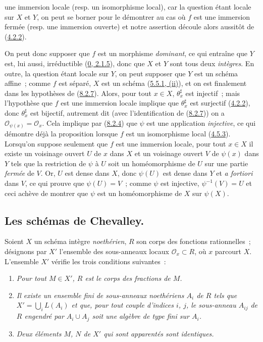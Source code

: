 une immersion locale (resp. un isomorphisme local), car la question étant
locale sur $X$ et $Y$, on peut se borner pour le démontrer au cas où $f$ est
une immersion fermée (resp. une immersion ouverte) et notre assertion découle
alors aussitôt de (\hyperref[I.4.2.2-fr]{4.2.2}).

On peut donc supposer que $f$ est un morphisme \emph{dominant}, ce qui
entraîne que $Y$ est, lui aussi, irréductible
(\hyperref[0.2.1.5-fr]{0, 2.1.5}), donc que $X$ et $Y$ sont tous deux
\emph{intègres}. En outre, la question étant locale sur $Y$, on peut supposer
que $Y$ est un schéma affine~; comme $f$ est séparé, $X$ est un schéma
(\hyperref[I.5.5.1-fr]{5.5.1, (ii)}), et on est finalement dans les
hypothèses de (\hyperref[I.8.2.7-fr]{8.2.7}). Alors, pour tout $x\in X$,
$\theta_x^\sharp$ est injectif~; mais l'hypothèse que $f$ est une immersion
locale implique que $\theta_x^\sharp$ est surjectif
(\hyperref[I.4.2.2-fr]{4.2.2}), donc $\theta_x^\sharp$ est bijectif,
autrement dit (avec l'identification de
(\hyperref[I.8.2.7-fr]{8.2.7})) on a
$\mathscr{O}_{\psi(x)}=\mathscr{O}_x$. Cela implique par
(\hyperref[I.8.2.4-fr]{8.2.4}) que $\psi$ est une application
\emph{injective}, ce qui démontre déjà la proposition lorsque $f$ est un
isomorphisme local (\hyperref[I.4.5.3-fr]{4.5.3}). Lorsqu'on suppose seulement
que $f$ est une immersion locale, pour tout $x\in X$ il existe un voisinage
ouvert $U$ de $x$ dans $X$ et un voisinage ouvert $V$ de $\psi(x)$ dans $Y$
tels que la restriction de $\psi$ à $U$ soit un homéomorphisme de $U$ sur une
partie \emph{fermée} de $V$. Or, $U$ est dense dans $X$, donc $\psi(U)$ est
dense dans $Y$ et \emph{a fortiori} dans $V$, ce qui prouve que
$\psi(U)=V$~; comme $\psi$ est injective, $\psi^{-1}(V)=U$ et ceci achève de
montrer que $\psi$ est un homéomorphisme de $X$ sur $\psi(X)$.

\subsection{Les schémas de Chevalley.}
\label{subsection:I.8.3-fr}

\begin{env}[8.3.1]
\label{I.8.3.1-fr}
Soient $X$ un schéma intègre \emph{noethérien}, $R$ son corps des fonctions
rationnelles~; désignons par $X'$ l'ensemble des sous-anneaux locaux
$\mathscr{O}_x\subset R$, où $x$ parcourt $X$. L'ensemble $X'$ vérifie les
trois conditions suivantes~:
\begin{enumerate}
  \item[(Sch. 1)] \emph{Pour tout $M\in X'$, $R$ est le corps des fractions
    de $M$.}
  \item[(Sch. 2)] \emph{Il existe un ensemble fini de sous-anneaux
    noethériens $A_i$ de $R$ tels que $X'=\bigcup_i L(A_i)$ et que, pour tout
    couple d'indices $i$, $j$, le sous-anneau $A_{ij}$ de $R$ engendré par
    $A_i\cup A_j$ soit une algèbre de type fini sur $A_i$.}
  \item[(Sch. 3)] \emph{Deux éléments $M$, $N$ de $X'$ qui sont apparentés
    sont identiques.}
\end{enumerate}
\end{env}

